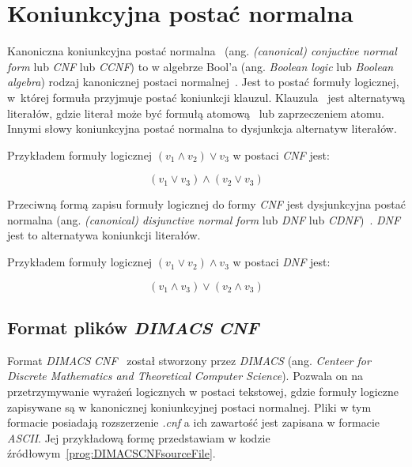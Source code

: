 	\section{Koniunkcyjna postać normalna}\label{sec:CNF}
	
	Kanoniczna koniunkcyjna postać normalna~\cite{wikiKoniunkcyjnaPostacNormalna,wikiConjunctiveNormalForm} (ang. \emph{(canonical) conjuctive  normal form} lub \emph{CNF} lub \emph{CCNF}) to w algebrze Bool'a (ang. \emph{Boolean logic} lub \emph{Boolean algebra}) rodzaj kanonicznej postaci normalnej~\cite{wikiCanonicalNormalForm}. Jest to postać formuły logicznej, w~której formuła przyjmuje postać koniunkcji klauzul. Klauzula~\cite{wikiKlauzula,wikiClause} jest alternatywą literałów, gdzie literał może być formułą atomową~\cite{wikiAtom} lub zaprzeczeniem atomu. Innymi słowy koniunkcyjna postać normalna to dysjunkcja alternatyw literałów.
	
	Przykładem formuły logicznej $(v_1 \land v_2) \lor v_3$ w postaci \emph{CNF} jest:
	
	\begin{equation}
	    (v_1 \lor v_3) \land (v_2 \lor v_3)
	\end{equation}
	
	Przeciwną formą zapisu formuły logicznej do formy \emph{CNF} jest dysjunkcyjna postać normalna (ang. \emph{(canonical) disjunctive normal form} lub \emph{DNF} lub \emph{CDNF})~\cite{wikiDysjunkcyjnaPostacNormalna}. \emph{DNF} jest to alternatywa koniunkcji literałów.
	
	Przykładem formuły logicznej $(v_1 \lor v_2) \land v_3$ w postaci \emph{DNF} jest:
	
	\begin{equation}
	    (v_1 \land v_3) \lor (v_2 \land v_3)
	\end{equation}
	
	\subsection{Format plików \emph{DIMACS} \emph{CNF}}\label{sec:CNFFiles}
	
	Format \emph{DIMACS} \emph{CNF}~\cite{CNFFiles,CNFFileFormat,CNF_DIMACSFileFormat} został stworzony przez \emph{DIMACS} (ang. \emph{Centeer for Discrete Mathematics and Theoretical Computer Science}). Pozwala on na przetrzymywanie wyrażeń logicznych w postaci tekstowej, gdzie formuły logiczne zapisywane są w kanonicznej koniunkcyjnej postaci normalnej. Pliki w tym formacie posiadają rozszerzenie \emph{.cnf} a ich zawartość jest zapisana w formacie \emph{ASCII}. Jej przykładową formę przedstawiam w kodzie źródłowym~\ref{prog:DIMACSCNFsourceFile}.
	
